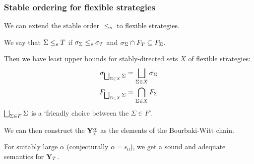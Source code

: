 \documentclass{beamer}
\begin{document}
\begin{frame}
  \frametitle{Stable ordering for flexible strategies}
  \pause
  We can extend the stable order ${\;\le_s\;}$ to flexible strategies.

  \pause
  We say that $\Sigma{\;\le_s\;}T$ if $\sigma_\Sigma{\;\le_s\;}\sigma_T$ and $\sigma_\Sigma\cap F_T\subseteq F_\Sigma$.  

  \pause
  Then we have least upper bounds for stably-directed sets $X$ of flexible strategies:
  \begin{gather*}
    \sigma_{\bigsqcup_{\Sigma\in X}\Sigma} = \bigsqcup_{\Sigma\in X}\sigma_\Sigma \\
    F_{\bigsqcup_{\Sigma\in X}\Sigma} = \bigcap_{\Sigma\in X}F_\Sigma
  \end{gather*}
  \pause
  $\bigsqcup_{\Sigma\in F}\Sigma$ is a `friendly choice between the $\Sigma\in F$'.  

  \pause
  We can then construct the $\mathbf{Y}_T^\alpha$ as the elements of the Bourbaki-Witt chain.  

  \pause
  For suitably large $\alpha$ (conjecturally $\alpha=\epsilon_0$), we get a sound and adequate semantics for $\mathbf{Y}_T$.  
\end{frame}
\end{document}
